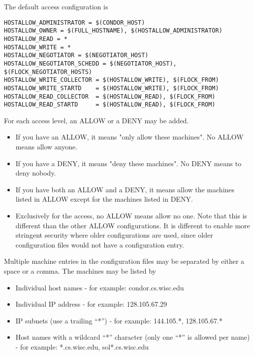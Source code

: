 The default access configuration is
\begin{verbatim}
HOSTALLOW_ADMINISTRATOR = $(CONDOR_HOST)
HOSTALLOW_OWNER = $(FULL_HOSTNAME), $(HOSTALLOW_ADMINISTRATOR)
HOSTALLOW_READ = *
HOSTALLOW_WRITE = *
HOSTALLOW_NEGOTIATOR = $(NEGOTIATOR_HOST)
HOSTALLOW_NEGOTIATOR_SCHEDD = $(NEGOTIATOR_HOST), $(FLOCK_NEGOTIATOR_HOSTS)
HOSTALLOW_WRITE_COLLECTOR = $(HOSTALLOW_WRITE), $(FLOCK_FROM)
HOSTALLOW_WRITE_STARTD    = $(HOSTALLOW_WRITE), $(FLOCK_FROM)
HOSTALLOW_READ_COLLECTOR  = $(HOSTALLOW_READ), $(FLOCK_FROM)
HOSTALLOW_READ_STARTD     = $(HOSTALLOW_READ), $(FLOCK_FROM)
\end{verbatim}

For each access level, an ALLOW or a DENY may be added.
\begin{itemize}

\item If you have an ALLOW, it means "only allow these machines".  No
    ALLOW means allow anyone.

\item If you have a DENY, it means "deny these machines".  No DENY
    means to deny nobody.

\item If you have both an ALLOW and a DENY, it means allow the
    machines listed in ALLOW except for the machines listed in DENY.

\item Exclusively for the  access,
    no ALLOW means allow no one.
    Note that this is different than the other ALLOW configurations.
    It is different to enable more stringent security where
    older configurations are used, since
    older configuration files would not have a 
     configuration entry.
\end{itemize}

Multiple machine entries
in the configuration files
may be separated by either a space or a comma.
The machines may be listed by

\begin{itemize}
\item Individual host names - for example: condor.cs.wisc.edu
\item Individual IP address - for example: 128.105.67.29
\item IP subnets (use a trailing ``*'') - for example: 144.105.*, 128.105.67.*
\item Host names with a wildcard ``*'' character (only one ``*'' is
    allowed per name) - for example: *.cs.wisc.edu, sol*.cs.wisc.edu
\end{itemize}

